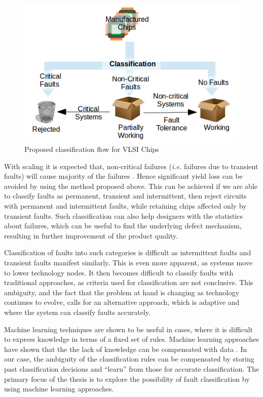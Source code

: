 \begin{figure}[h]
  \begin{center}
    \captionsetup{justification=centering}
    \includegraphics[scale=0.55]{figures/proposedflow.png}
    \caption{Proposed classification flow for VLSI Chips}
    \label{fig:proposedflow}
  \end{center}
\end{figure}

With scaling it is expected that, non-critical failures (\emph{i.e.} failures due to transient faults) will cause majority of the failures \cite{Constantinescu2003}. Hence significant yield loss can be avoided by using the method proposed above. This can be achieved if we are able to classify faults as permanent, transient and intermittent, then reject circuits with permanent and intermittent faults, while retaining chips affected only by transient faults. Such classification can also help designers with the statistics about failures, which can be useful to find the underlying defect mechanism, resulting in further improvement of the product quality.

Classification of faults into such categories is difficult as intermittent faults and transient faults manifest similarly. This is even more apparent, as systems move to lower technology nodes. It then becomes difficult to classify faults with traditional approaches, as criteria used for classification are not conclusive. This ambiguity, and the fact that the problem at hand is changing as technology continues to evolve, calls for an alternative approach, which is adaptive and where the system can classify faults accurately.

Machine learning techniques are shown to be useful in cases, where it is difficult to express knowledge in terms of a fixed set of rules. Machine learning approaches have shown that the the lack of knowledge can be compensated with data \cite{Alpaydin2004}. In our case, the ambiguity of the classification rules can be compensated by storing past classification decisions and \enquote{learn} from those for accurate classification. The primary focus of the thesis is to explore the possibility of fault classification by using machine learning approaches.

